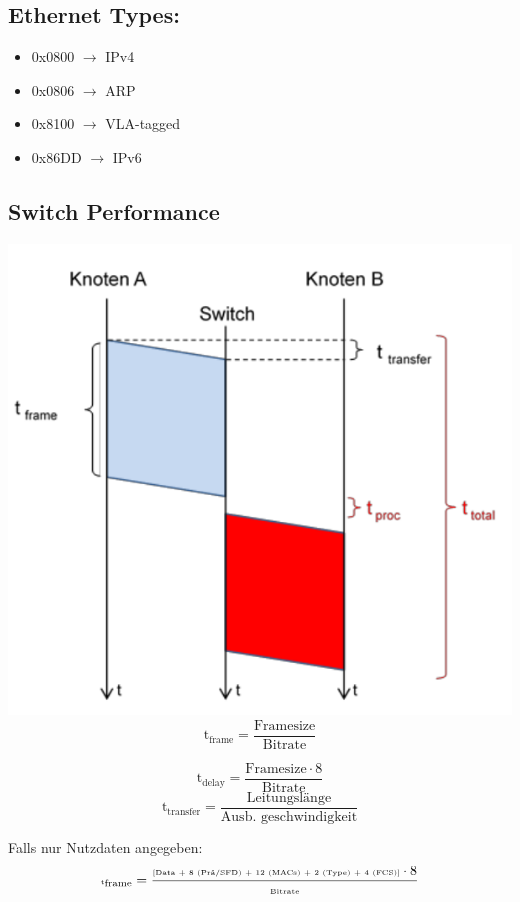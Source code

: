 \columnbreak
\subsection{Ethernet Types:}{

    \begin{itemize}[noitemsep]
        \item 0x0800 $\to$ IPv4
        \item 0x0806 $\to$  ARP
        \item  0x8100 $\to$  VLA-tagged
        \item  0x86DD $\to$  IPv6
    \end{itemize}




}
\subsection{Switch Performance}{

    \includegraphics[scale=.3]{img/sw-perf.png}
    \\
    $$ \text{t}_\text{frame} = \frac{\text{Framesize}}{\text{Bitrate}}  $$

    $$ \text{t}_\text{delay} = \frac{\text{Framesize} \cdot 8}{\text{Bitrate}}  $$
    $$ \text{t}_\text{transfer} = \frac{\text{Leitungslänge}}{\text{Ausb. geschwindigkeit}}  $$

    Falls nur Nutzdaten angegeben:
    $$ \tiny \text{t}_\text{frame} = \frac{\text{[Data + 8 (Prä/SFD) + 12 (MACs) + 2 (Type) + 4 (FCS)]}\cdot 8}{\text{Bitrate}}  $$

}
\vfill\null
\columnbreak
